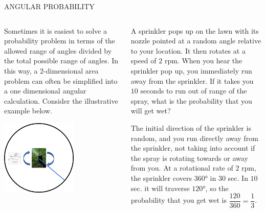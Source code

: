 \documentclass[9pt,aspectratio=169]{beamer}
\begin{document}
\begin{frame}{ANGULAR PROBABILITY}
  \begin{columns}[T]
    \begin{column}{0.5\textwidth}
      Sometimes it is easiest to solve a probability problem in terms of the allowed range of angles divided by the total possible range of angles.  In this way, a 2-dimensional area problem can often be simplified into a one dimensional angular calculation.  Consider the illustrative example below.
      \begin{center}
        \includegraphics[width=0.6\textwidth]{16 - Geometric Probability/sprinkler.png}
      \end{center}
    \end{column}
    \begin{column}{0.5\textwidth}
      \begin{problem}
        A sprinkler pops up on the lawn with its nozzle pointed at a random angle relative to your location.  It then rotates at a speed of $2$ rpm.  When you hear the sprinkler pop up, you immediately run away from the sprinkler.  If it takes you $10$ seconds to run out of range of the spray, what is the probability that you will get wet?
      \end{problem}
      The initial direction of the sprinkler is random, and you run directly away from the sprinkler, not taking into account if the spray is rotating towards or away from you.  At a rotational rate of $2$ rpm, the sprinkler covers $360°$ in $30$ sec. In $10$ sec. it will traverse $120°$, so the probability that you get wet is $\dfrac{120}{360} = \dfrac{1}{3}$.

    \end{column}
  \end{columns}
\end{frame}
\end{document}
